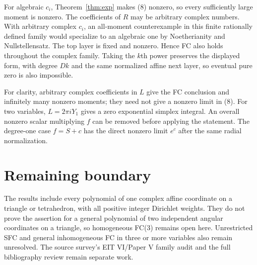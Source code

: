 \documentclass[11pt]{article}
\begin{document}
For algebraic $c_i$, Theorem~\ref{thm:exp} makes (8) nonzero, so every
sufficiently large moment is nonzero. The coefficients of $R$ may be
arbitrary complex numbers. With arbitrary complex $c_i$, an all-moment
counterexample in this finite rationally defined family would specialize
to an algebraic one by Noetherianity and Nullstellensatz. The top layer
is fixed and nonzero. Hence FC also holds throughout the complex family.
Taking the $k$th power preserves the displayed form, with degree $Dk$
and the same normalized affine next layer, so eventual pure zero is
also impossible.

For clarity, arbitrary complex coefficients in $L$ give the FC conclusion
and infinitely many nonzero moments; they need not give a nonzero limit
in (8). For two variables, $L=2\pi iY_1$ gives a zero exponential simplex
integral. An overall nonzero scalar multiplying $f$ can be removed before
applying the statement. The degree-one case $f=S+c$ has the direct nonzero
limit $e^c$ after the same radial normalization.

\section{Remaining boundary}
The results include every polynomial of one complex affine coordinate on
a triangle or tetrahedron, with all positive integer Dirichlet weights.
They do not prove the assertion for a general polynomial of two independent
angular coordinates on a triangle, so homogeneous FC(3) remains open here.
Unrestricted SFC and general inhomogeneous FC in three or more variables
also remain unresolved. The source survey's EIT VI/Paper V family audit
and the full bibliography review remain separate work.
\end{document}
